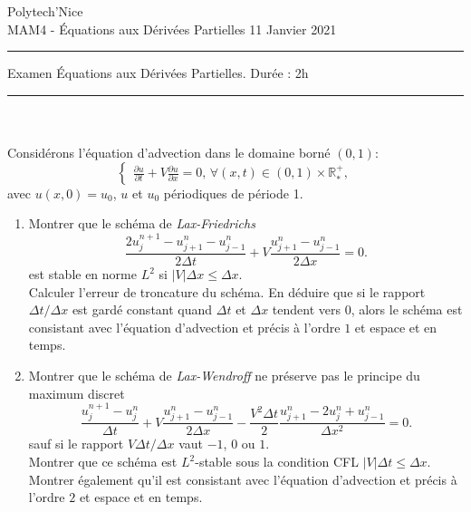 \documentclass[12pt,a4paper]{article}
\begin{document}
 \hfill Polytech'Nice\\
\noindent MAM4 - \'Equations aux D\'eriv\'ees Partielles \hfill 
11 Janvier 2021 \\

\hrule

\vspace{0.6cm}
\centerline {\large \sc Examen \'Equations aux D\'eriv\'ees Partielles. Dur\'ee : 2h}
\vspace{0.6cm}


\hrule
\vspace{0.7cm}
\\

\\%

\noindent Consid\'erons l'\'equation d'advection dans le domaine born\'e $(0,1)$:
$$
\begin{cases}
\displaystyle\frac{\partial u}{\partial t}+V\frac{\partial u}{\partial
  x}=0,\, \forall (x,t)\in(0,1)\times\mathbb{R}^+_*,
\end{cases}
$$
avec $u(x, 0) = u_0$, $u$ et $u_0$ p\'eriodiques de p\'eriode 1.
\begin{enumerate}
\item Montrer que le sch\'ema de {\it Lax-Friedrichs} 
$$
\frac{2u_j^{n+1}-u_{j+1}^{n}-u_{j-1}^{n}}{2\Delta t}+V \frac{u_{j+1}^{n}-u_{j-1}^{n}}{2\Delta x}=0.
$$
est stable en norme $L^2$ si $|V|\Delta x \le \Delta x$. \\

Calculer l'erreur de troncature du sch\'ema.
En d\'eduire que si le rapport $\Delta t/\Delta x$ est gard\'e
constant quand $\Delta t$ et $\Delta x$ tendent vers $0$, alors le
sch\'ema est consistant avec l'\'equation d'advection et pr\'ecis \`a l'ordre $1$
et espace et en temps. 

\item  Montrer que le sch\'ema de {\it Lax-Wendroff} ne pr\'eserve pas le principe du maximum
discret
$$
\frac{u_j^{n+1}-u_{j}^{n}}{\Delta t}+V
\frac{u_{j+1}^{n}-u_{j-1}^{n}}{2\Delta x}-\frac{V^2\Delta t}{2}\frac{u_{j+1}^{n}-2u_j^n+u_{j-1}^{n}}{\Delta x^2}=0.
$$
sauf si le rapport $V\Delta t/\Delta x$ vaut $-1$, $0$ ou $1$. \\

Montrer que ce sch\'ema  est $L^2$-stable sous la condition CFL $|V|\Delta t \le
\Delta x$. \\ %

Montrer \'egalement qu'il est consistant avec l'\'equation d'advection et pr\'ecis \`a l'ordre $2$
et espace et en temps. 
\end{enumerate}
\end{document}

